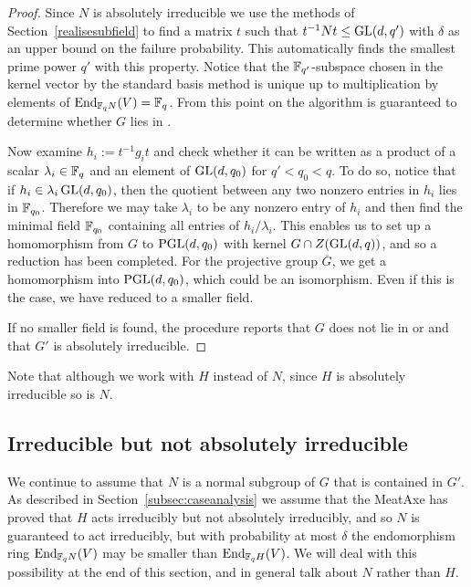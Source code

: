 \begin{proof}
Since $N$ is absolutely irreducible we use the methods of
Section~\ref{realisesubfield} to find a matrix $t$ such that $t^{-1}Nt
\leq \GL(d, q')$
with $\delta$ as an upper bound on the failure probability.
This automatically finds the smallest prime power $q'$ with this       
property. Notice that the $\mathbb{F}_{q'}$-subspace chosen in the kernel 
vector by the standard basis method is unique up to multiplication 
by elements of $\End_{\F_q N}(V) = \F_q$.   From this point on 
the algorithm is guaranteed to determine   
whether $G$ lies in .                                               

Now examine $h_i:= t^{-1}g_it$ and check whether it can be written as a
product of a scalar $\lambda_i \in \mathbb{F}_{q}$ and an element of $\GL(d,
q_0)$ for $q' < q_0 < q$. 
To do so, notice that if $h_i \in \lambda_i \GL(d,q_0)$,
then the quotient between any two
nonzero entries in $h_i$ lies in $\mathbb{F}_{q_0}$. 
Therefore we may take
$\lambda_i$ to be any nonzero entry of $h_i$ and then find the
minimal field $\mathbb{F}_{q_0}$ containing all entries of $h_i / \lambda_i$. 
This enables us to set up a homomorphism from $G$ to $\PGL(d, q_0)$
with kernel $G \cap Z(\GL(d, q))$, and so a reduction has been
completed. 
For the projective group $\overline{G}$,
we get a homomorphism into $\PGL(d,q_0)$, which could be
an isomorphism. Even if this is the case, we have reduced to a smaller field. 

If no smaller field is found, the procedure reports that
 $G$ does not lie in  or  and that $G'$ is absolutely irreducible.
\end{proof}

Note that although we work with $H$ instead of $N$, 
since $H$ is absolutely irreducible so is $N$. 


\subsection{Irreducible but not absolutely irreducible} \label{subsec:semilin}

We continue to assume that $N$ is a normal subgroup of $G$ that is
contained in $G'$. As described in
Section~\ref{subsec:caseanalysis} we assume that the MeatAxe has proved
that $H$ acts irreducibly but not absolutely
irreducibly, and so $N$ is guaranteed to act irreducibly, but with 
probability at most $\delta$ the endomorphism ring $\End_{\F_q N}(V)$ may 
be smaller than $\End_{\F_q H}(V)$. 
We will deal with this possibility at the end of this section, 
and in general talk about $N$ rather than $H$.

